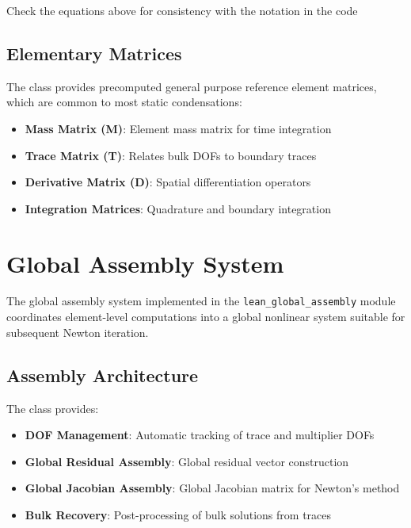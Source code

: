 \begin{todobox}{Check the equations above for consistency with the notation in the code}
\end{todobox}

\subsection{Elementary Matrices}

The  class provides precomputed general purpose reference element matrices, which are common to most static condensations:
\begin{itemize}
    \item \textbf{Mass Matrix (M)}: Element mass matrix for time integration
    \item \textbf{Trace Matrix (T)}: Relates bulk DOFs to boundary traces
    \item \textbf{Derivative Matrix (D)}: Spatial differentiation operators
    \item \textbf{Integration Matrices}: Quadrature and boundary integration
\end{itemize}

\section{Global Assembly System}
\label{sec:global_assembly}

The global assembly system implemented in the {\tt lean\_global\_assembly} module coordinates element-level computations into a global nonlinear system suitable for subsequent Newton iteration.

\subsection{Assembly Architecture}

The  class provides:
\begin{itemize}
    \item \textbf{DOF Management}: Automatic tracking of trace and multiplier DOFs
    \item \textbf{Global Residual Assembly}: Global residual vector construction
    \item \textbf{Global Jacobian Assembly}: Global Jacobian matrix for Newton's method
    \item \textbf{Bulk Recovery}: Post-processing of bulk solutions from traces
\end{itemize}

